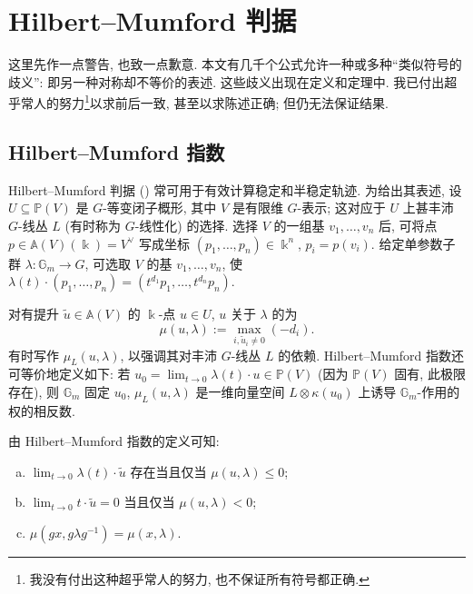 \section{Hilbert--Mumford 判据}\label{src:8.4}
\begin{epigraph}
这里先作一点警告, 也致一点歉意. 本文有几千个公式允许一种或多种``类似符号的歧义'': 即另一种对称却不等价的表述. 这些歧义出现在定义和定理中. 我已付出超乎常人的努力\footnote{我没有付出这种超乎常人的努力, 也不保证所有符号都正确.}以求前后一致, 甚至以求陈述正确; 但仍无法保证结果.
\end{epigraph}
\subsection{Hilbert--Mumford 指数}\label{src:8.4.1-subsection}
Hilbert--Mumford 判据 () 常可用于有效计算稳定和半稳定轨迹. 为给出其表述, 设 $U\subseteq\mathbb P(V)$ 是 $G$-等变闭子概形, 其中 $V$ 是有限维 $G$-表示; 这对应于 $U$ 上甚丰沛 $G$-线丛 $L$ (有时称为 $G$-线性化) 的选择. 选择 $V$ 的一组基 $v_1,\ldots,v_n$ 后, 可将点 $p\in\mathbb A(V)(\Bbbk)=V^\vee$ 写成坐标 $(p_1,\ldots,p_n)\in\Bbbk^n$, $p_i=p(v_i)$. 给定单参数子群 $\lambda:\mathbb G_m\to G$, 可选取 $V$ 的基 $v_1,\ldots,v_n$, 使 $\lambda(t)\cdot(p_1,\ldots,p_n)=(t^{d_1}p_1,\ldots,t^{d_n}p_n)$.
\begin{definition}\label{src:8.4.1}
对有提升 $\widetilde u\in\mathbb A(V)$ 的 $\Bbbk$-点 $u\in U$, $u$ 关于 $\lambda$ 的为
\begin{equation}\label{src:8.4.2}
\mu(u,\lambda):=\max_{i,\widetilde u_i\ne0}(-d_i).
\end{equation}
有时写作 $\mu_L(u,\lambda)$, 以强调其对丰沛 $G$-线丛 $L$ 的依赖. Hilbert--Mumford 指数还可等价地定义如下: 若 $u_0=\lim_{t\to0}\lambda(t)\cdot u\in\mathbb P(V)$ (因为 $\mathbb P(V)$ 固有, 此极限存在), 则 $\mathbb G_m$ 固定 $u_0$, $\mu_L(u,\lambda)$ 是一维向量空间 $L\otimes\kappa(u_0)$ 上诱导 $\mathbb G_m$-作用的权的相反数.
\end{definition}
\begin{remark}\label{src:8.4.3}
由 Hilbert--Mumford 指数的定义可知:
\begin{enumerate}[(a)]
\item $\lim_{t\to0}\lambda(t)\cdot\widetilde u$ 存在当且仅当 $\mu(u,\lambda)\leq0$;
\item $\lim_{t\to0}t\cdot\widetilde u=0$ 当且仅当 $\mu(u,\lambda)<0$;
\item $\mu(gx,g\lambda g^{-1})=\mu(x,\lambda)$.
\end{enumerate}
\end{remark}
